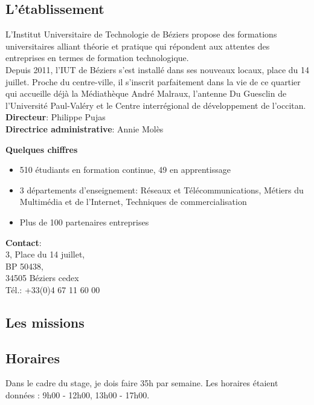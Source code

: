 \documentclass[12pt, french]{report}
\begin{document}
\subsection*{L'établissement}

L'Institut Universitaire de Technologie de Béziers propose des formations universitaires alliant théorie et pratique qui répondent aux attentes des entreprises en termes de formation technologique. \\

Depuis 2011, l’IUT de Béziers s’est installé dans ses nouveaux locaux, place du 14 juillet. Proche du centre-ville, il s’inscrit parfaitement dans la vie de ce quartier qui accueille déjà la Médiathèque André Malraux, l’antenne Du Guesclin de l’Université Paul-Valéry et le Centre interrégional de développement de l’occitan.\\

\textbf{Directeur}: Philippe Pujas\\

\textbf{Directrice administrative}: Annie Molès\\
\bigskip

\textbf{Quelques chiffres}\\
\begin{itemize}
        \item 510 étudiants en formation continue, 49 en apprentissage
        \item 3 départements d'enseignement: Réseaux et Télécommunications, Métiers du Multimédia et de l'Internet, Techniques de commercialisation
        \item Plus de 100 partenaires entreprises\\
\end{itemize} 


\textbf{Contact}:\\ 3, Place du 14 juillet,\\ BP 50438,\\ 34505 Béziers cedex\\ Tél.: +33(0)4 67 11 60 00


\subsection*{Les missions}
\subsection*{Horaires}
Dans le cadre du stage, je dois faire 35h par semaine. Les horaires étaient données :
9h00 - 12h00, 13h00 - 17h00.
\end{document}
